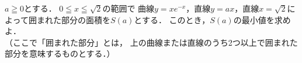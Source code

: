 \documentclass[../../main.tex]{subfiles}
\begin{document}
$a\geqq0$とする．
$0 \leqq x \leqq \sqrt2$の範囲で
曲線$y=xe^{-x}$，直線$y=ax$，直線$x=\sqrt2$によって囲まれた部分の面積を$S(a)$とする．
このとき，$S(a)$の最小値を求めよ．\\
（ここで「囲まれた部分」とは，
上の曲線または直線のうち2つ以上で囲まれた部分を意味するものとする．）
\end{document}
